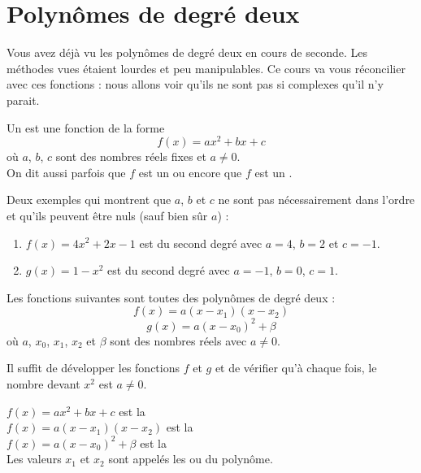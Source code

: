 \documentclass[cours]{lycee-deveaux}
\begin{document}

\maketitle

%
%
%
%
%
\section{Polynômes de degré deux}

Vous avez déjà vu les polynômes de degré deux en cours de seconde.
Les méthodes vues étaient lourdes et peu manipulables.
Ce cours va vous réconcilier avec ces fonctions : nous allons voir qu'ils ne sont pas si
complexes qu'il n'y parait.


\begin{definition}
  Un  est une fonction de la forme
  \[
  f(x) = ax^2 + bx + c
  \]
  où $a$, $b$, $c$ sont des nombres réels fixes et $a\neq 0$.\\
  On dit aussi parfois que $f$ est un  ou encore que $f$
  est un .
\end{definition}

\begin{exemple}
  Deux exemples qui montrent que $a$, $b$ et $c$ ne sont pas nécessairement dans l'ordre et
  qu'ils peuvent être nuls (sauf bien sûr $a$) :
  \begin{enumerate}
  \item
    $f(x) = 4x^2+2x-1$ est du second degré avec $a=4$, $b=2$ et $c=-1$.
  \item
    $g(x) = 1-x^2$ est du second degré avec $a=-1$, $b=0$, $c=1$.
  \end{enumerate}
\end{exemple}


\begin{propriete}
  \label{propriete-factorisee-canonique}
  Les fonctions suivantes sont toutes des polynômes de degré deux :
  \[
  f(x) = a(x-x_1)(x-x_2)
  \]
  \[
  g(x) = a(x-x_0)^2+\beta
  \]
  où $a$, $x_0$, $x_1$, $x_2$ et $\beta$ sont des nombres réels avec
  $a\neq 0$.
\end{propriete}

Il suffit de développer les fonctions $f$ et $g$ et
de vérifier qu'à chaque fois, le nombre devant $x^2$ est $a\neq 0$.


\begin{definition}
  $f(x) = ax^2+bx+c$ est la \\
  $f(x) = a(x-x_1)(x-x_2)$ est la \\
  $f(x) = a(x-x_0)^2+\beta$ est la \\
  Les valeurs $x_1$ et $x_2$ sont appelés les  ou
   du polynôme.
\end{definition}
\end{document}
